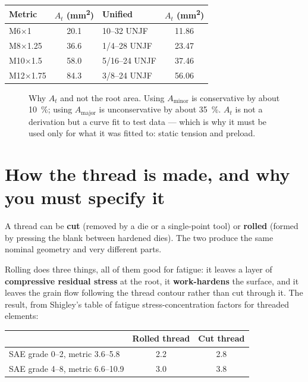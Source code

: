 \documentclass[11pt,a4paper]{article}
\begin{document}
\begin{center}\small
\begin{tabular}{@{}lS[table-format=2.1]@{\qquad}lS[table-format=2.2]@{}}
\toprule
\textbf{Metric} & {$A_t$ (\si{mm^2})} & \textbf{Unified} & {$A_t$ (\si{mm^2})}\\
\midrule
M6$\times$1 & 20.1 & 10--32 UNJF & 11.86\\
M8$\times$1.25 & 36.6 & 1/4--28 UNJF & 23.47\\
M10$\times$1.5 & 58.0 & 5/16--24 UNJF & 37.46\\
M12$\times$1.75 & 84.3 & 3/8--24 UNJF & 56.06\\
\bottomrule
\end{tabular}
\end{center}

\begin{figure}[H]\centering
\resizebox{0.80\textwidth}{!}{}
\caption{Why $A_t$ and not the root area. Using $A_{\text{minor}}$ is conservative by about
\SI{10}{\percent}; using $A_{\text{major}}$ is unconservative by about \SI{35}{\percent}. $A_t$ is not
a derivation but a curve fit to test data --- which is why it must be used only for what it was fitted
to: static tension and preload.}
\end{figure}

\section{How the thread is made, and why you must specify it}\label{sec:making}

A thread can be \textbf{cut} (removed by a die or a single-point tool) or \textbf{rolled} (formed by
pressing the blank between hardened dies). The two produce the same nominal geometry and very different
parts.

Rolling does three things, all of them good for fatigue: it leaves a layer of \textbf{compressive
residual stress} at the root, it \textbf{work-hardens} the surface, and it leaves the grain flow
following the thread contour rather than cut through it. The result, from Shigley's table of fatigue
stress-concentration factors for threaded elements:

\begin{center}\small
\begin{tabular}{@{}lcc@{}}
\toprule
 & \textbf{Rolled thread} & \textbf{Cut thread}\\
\midrule
SAE grade 0--2, metric 3.6--5.8 & 2.2 & 2.8\\
SAE grade 4--8, metric 6.6--10.9 & 3.0 & 3.8\\
\bottomrule
\end{tabular}
\end{center}
\end{document}
